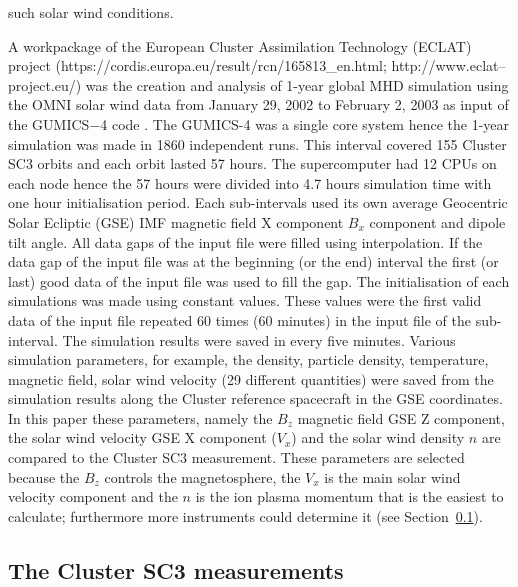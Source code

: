 \documentclass[linenumbers,draft]{agujournal}
\begin{document}
such solar wind conditions.

A workpackage of the European Cluster Assimilation Technology (ECLAT) project (https://cordis.europa.eu/result/rcn/165813\_en.html; http://www.eclat--project.eu/) was the creation and analysis of 1-year global MHD simulation using the OMNI solar wind data  from January 29, 2002 to February 2, 2003 as input of the GUMICS$-$4 code \citep{facsko16:_one_earth}. The GUMICS-4 was a single core system \citep{janhunen12:_gumic_mhd} hence the 1-year simulation was made in 1860 independent runs. This interval covered 155 Cluster SC3 orbits and each orbit lasted 57 hours. The supercomputer had 12 CPUs on each node hence the 57 hours were divided into 4.7 hours simulation time with one hour initialisation period. Each sub-intervals used its own average Geocentric Solar Ecliptic (GSE) IMF magnetic field X component $B_x$ component and dipole tilt angle. All data gaps of the input file were filled using interpolation. If the data gap of the input file was at the beginning (or the end) interval the first (or last) good data of the input file was used to fill the gap. The initialisation of each simulations was made using constant values. These values were the first valid data of the input file repeated 60 times (60 minutes) in the input file of the sub-interval. The simulation results were saved in every five minutes. Various simulation parameters, for example, the density, particle density, temperature, magnetic field, solar wind velocity (29 different quantities) were saved from the simulation results along the Cluster reference spacecraft in the GSE coordinates. In this paper these parameters, namely the $B_z$ magnetic field GSE Z component, the solar wind velocity GSE X component ($V_x$) and the solar wind density $n$ are compared to the Cluster SC3 measurement. These parameters are selected because the $B_z$ controls the magnetosphere, the $V_x$ is the main solar wind velocity component and the $n$ is the ion plasma momentum that is the easiest to calculate; furthermore more instruments could determine it (see Section~\ref{sec:cluster}).

\subsection{The Cluster SC3 measurements}
\label{sec:cluster}
\end{document}
